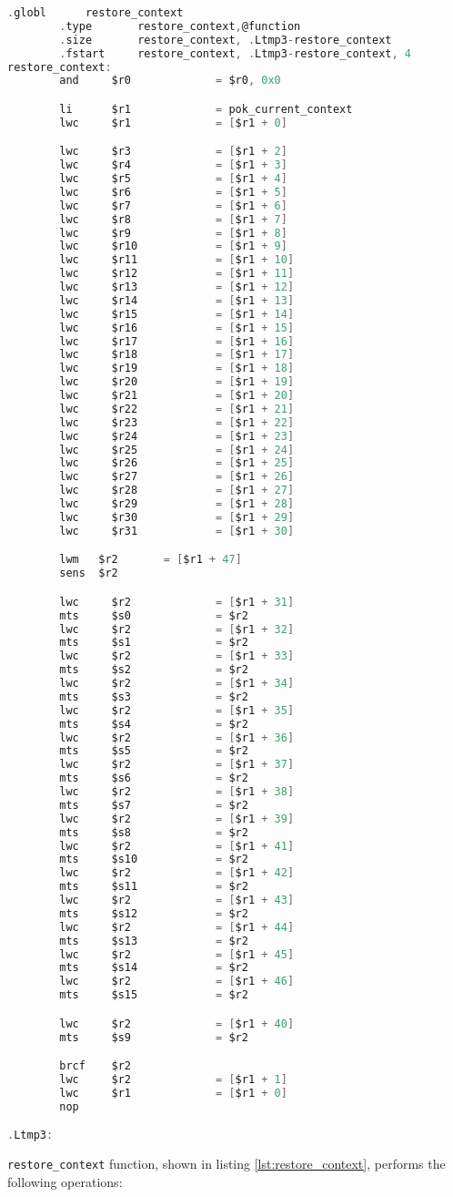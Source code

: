 \begin{lstlisting}[language=C, caption=Function \texttt{restore\_context} restores context of the new selected thread, label=lst:restore_context]
 		.globl 		restore_context
		.type 		restore_context,@function
		.size 		restore_context, .Ltmp3-restore_context
		.fstart		restore_context, .Ltmp3-restore_context, 4
restore_context:
		and 	$r0				= $r0, 0x0

		li		$r1				= pok_current_context
		lwc		$r1 			= [$r1 + 0]

		lwc  	$r3 			= [$r1 + 2]
		lwc  	$r4 			= [$r1 + 3]
		lwc  	$r5 			= [$r1 + 4]
		lwc  	$r6 			= [$r1 + 5]
		lwc  	$r7 			= [$r1 + 6]
		lwc  	$r8 			= [$r1 + 7]
		lwc  	$r9 			= [$r1 + 8]
 		lwc  	$r10 			= [$r1 + 9]
		lwc  	$r11 			= [$r1 + 10]
		lwc  	$r12			= [$r1 + 11]
		lwc  	$r13 			= [$r1 + 12]
		lwc  	$r14 			= [$r1 + 13]
		lwc  	$r15 			= [$r1 + 14]
		lwc  	$r16 			= [$r1 + 15]
		lwc  	$r17 			= [$r1 + 16]
		lwc  	$r18 			= [$r1 + 17]
		lwc  	$r19 			= [$r1 + 18]
		lwc  	$r20 			= [$r1 + 19]
		lwc  	$r21 			= [$r1 + 20]
		lwc  	$r22 			= [$r1 + 21]
		lwc  	$r23 			= [$r1 + 22]
		lwc  	$r24 			= [$r1 + 23]
		lwc  	$r25 			= [$r1 + 24]
		lwc  	$r26 			= [$r1 + 25]
		lwc  	$r27 			= [$r1 + 26]
		lwc  	$r28 			= [$r1 + 27]
		lwc  	$r29 			= [$r1 + 28]
		lwc  	$r30 			= [$r1 + 29]
		lwc  	$r31 			= [$r1 + 30]

		lwm   $r2       = [$r1 + 47]
 		sens  $r2

		lwc  	$r2 			= [$r1 + 31]
		mts  	$s0 			= $r2
		lwc  	$r2 			= [$r1 + 32]
		mts  	$s1 			= $r2
		lwc  	$r2 			= [$r1 + 33]
		mts  	$s2 			= $r2
		lwc  	$r2 			= [$r1 + 34]
		mts  	$s3 			= $r2
		lwc  	$r2 			= [$r1 + 35]
		mts  	$s4 			= $r2
		lwc  	$r2 			= [$r1 + 36]
		mts  	$s5 			= $r2
		lwc  	$r2 			= [$r1 + 37]
		mts  	$s6 			= $r2
		lwc  	$r2 			= [$r1 + 38]
		mts  	$s7 			= $r2
		lwc  	$r2 			= [$r1 + 39]
		mts  	$s8 			= $r2
		lwc  	$r2 			= [$r1 + 41]
		mts  	$s10 			= $r2
		lwc  	$r2 			= [$r1 + 42]
		mts  	$s11 			= $r2
		lwc  	$r2 			= [$r1 + 43]
		mts  	$s12 			= $r2
		lwc  	$r2 			= [$r1 + 44]
		mts  	$s13 			= $r2
		lwc  	$r2 			= [$r1 + 45]
		mts  	$s14 			= $r2
		lwc  	$r2 			= [$r1 + 46]
		mts  	$s15 			= $r2

		lwc  	$r2 			= [$r1 + 40]
		mts  	$s9 			= $r2

		brcf	$r2
		lwc  	$r2 			= [$r1 + 1]
		lwc  	$r1 			= [$r1 + 0]
		nop		

.Ltmp3:
\end{lstlisting}

\texttt{restore\_context} function, shown in listing \ref{lst:restore_context}, performs the following operations:


